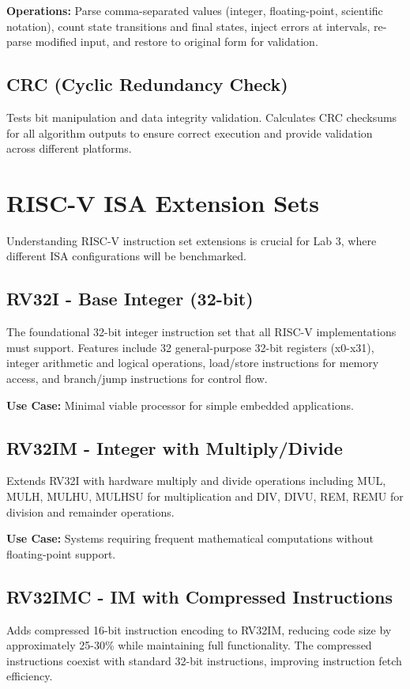 \documentclass[11pt,a4paper]{article}
\begin{document}
\textbf{Operations:} Parse comma-separated values (integer, floating-point, scientific notation), count state transitions and final states, inject errors at intervals, re-parse modified input, and restore to original form for validation.

\subsection{CRC (Cyclic Redundancy Check)}
Tests bit manipulation and data integrity validation. Calculates CRC checksums for all algorithm outputs to ensure correct execution and provide validation across different platforms.

\section{RISC-V ISA Extension Sets}

Understanding RISC-V instruction set extensions is crucial for Lab 3, where different ISA configurations will be benchmarked.

\subsection{RV32I - Base Integer (32-bit)}
The foundational 32-bit integer instruction set that all RISC-V implementations must support. Features include 32 general-purpose 32-bit registers (x0-x31), integer arithmetic and logical operations, load/store instructions for memory access, and branch/jump instructions for control flow.

\textbf{Use Case:} Minimal viable processor for simple embedded applications.

\subsection{RV32IM - Integer with Multiply/Divide}
Extends RV32I with hardware multiply and divide operations including MUL, MULH, MULHU, MULHSU for multiplication and DIV, DIVU, REM, REMU for division and remainder operations.

\textbf{Use Case:} Systems requiring frequent mathematical computations without floating-point support.

\subsection{RV32IMC - IM with Compressed Instructions}
Adds compressed 16-bit instruction encoding to RV32IM, reducing code size by approximately 25-30\% while maintaining full functionality. The compressed instructions coexist with standard 32-bit instructions, improving instruction fetch efficiency.
\end{document}

